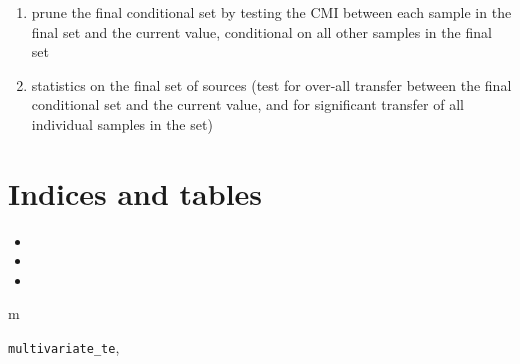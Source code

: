 \documentclass[letterpaper,10pt,english]{sphinxmanual}
\begin{document}
\begin{fulllineitems}
\begin{fulllineitems}
\begin{enumerate}
\item {} 
prune the final conditional set by testing the CMI between each
sample in the final set and the current value, conditional on all
other samples in the final set

\item {} 
statistics on the final set of sources (test for over-all transfer
between the final conditional set and the current value, and for
significant transfer of all individual samples in the set)

\end{enumerate}

\end{fulllineitems}


\end{fulllineitems}



\chapter{Indices and tables}
\label{index:indices-and-tables}\begin{itemize}
\item {} 

\item {} 

\item {} 

\end{itemize}


\renewcommand{\indexname}{Python Module Index}
\begin{theindex}
\def\bigletter#1{{\Large\sffamily#1}\nopagebreak\vspace{1mm}}
\bigletter{m}
\item {\texttt{multivariate\_te}}, \pageref{index:module-multivariate_te}
\end{theindex}

\renewcommand{\indexname}{Index}
\printindex
\end{document}
